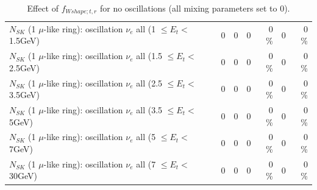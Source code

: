 \begin{table}
\begin{tabular}{| l | r | r | r  r | r  r |}
$N_{SK}$ (1 $\mu$-like ring): oscillation $\nu_{e}$ all (1 $\leq E_{t} <$ 1.5GeV) &               0 &               0 &               0 &        0 \%  &               0 &        0 \%  \\ 
$N_{SK}$ (1 $\mu$-like ring): oscillation $\nu_{e}$ all (1.5 $\leq E_{t} <$ 2.5GeV) &               0 &               0 &               0 &        0 \%  &               0 &        0 \%  \\ 
$N_{SK}$ (1 $\mu$-like ring): oscillation $\nu_{e}$ all (2.5 $\leq E_{t} <$ 3.5GeV) &               0 &               0 &               0 &        0 \%  &               0 &        0 \%  \\ 
$N_{SK}$ (1 $\mu$-like ring): oscillation $\nu_{e}$ all (3.5 $\leq E_{t} <$ 5GeV) &               0 &               0 &               0 &        0 \%  &               0 &        0 \%  \\ 
 $N_{SK}$ (1 $\mu$-like ring): oscillation $\nu_{e}$ all (5 $\leq E_{t} <$ 7GeV) &               0 &               0 &               0 &        0 \%  &               0 &        0 \%  \\ 
$N_{SK}$ (1 $\mu$-like ring): oscillation $\nu_{e}$ all (7 $\leq E_{t} <$ 30GeV) &               0 &               0 &               0 &        0 \%  &               0 &        0 \%  \\ 
\hline
\hline
\end{tabular}
\caption{ Effect of $f_{Wshape; t, r}$ for no oscillations (all mixing parameters set to 0). }
\label{tab:num_xsec_wshape_1RmuT_3f_osc_t13:0}
\end{table}
\clearpage
